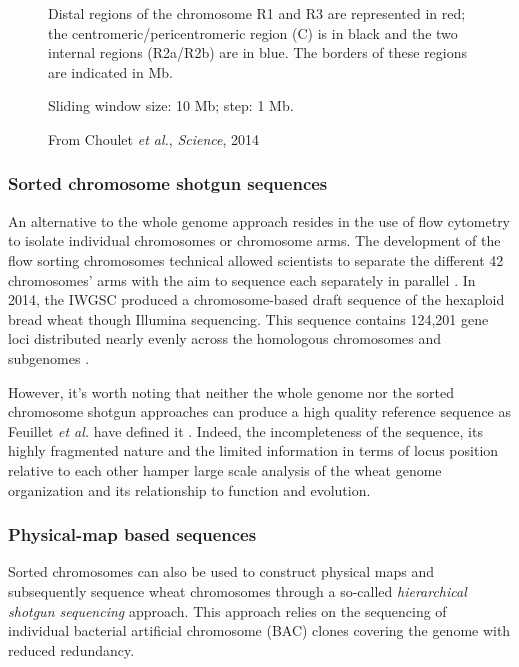 \documentclass[a4paper, 12pt]{article}
\begin{document}
\begin{onehalfspace}
\begin{figure}
{    Distal regions of the chromosome R1 and R3 are represented in red; the centromeric/pericentromeric region (C) is in black and the two internal regions (R2a/R2b) are in blue. The borders of these regions are indicated in Mb. 
    
    Sliding window size: 10 Mb; step: 1 Mb.
    
          \begin{flushright}
          From Choulet \textit{et al.}, \textit{Science}, 2014
          \end{flushright}}
    \end{figure}
\addtocounter{page}{-1}
\newpage
\clearpage %


            \subsubsection{Sorted chromosome shotgun sequences}

An alternative to the whole genome approach resides in the use of flow cytometry to isolate individual chromosomes or chromosome arms. The development of the flow sorting chromosomes technical allowed scientists to separate the different 42 chromosomes' arms with the aim to sequence each separately in parallel \citep{Dolezel2014}. In 2014, the IWGSC produced a chromosome-based draft sequence of the hexaploid bread wheat though Illumina sequencing. This sequence contains 124,201 gene loci distributed nearly evenly across the homologous chromosomes and subgenomes \citep{Mayer2014}.

However, it's worth noting that neither the whole genome nor the sorted chromosome shotgun approaches can produce a high quality reference sequence as Feuillet \textit{et al.} have defined it \citep{Feuillet2011}. Indeed, the incompleteness of the sequence, its highly fragmented nature and the limited information in terms of locus position relative to each other hamper large scale analysis of the wheat genome organization and its relationship to function and evolution.

            \subsubsection{Physical-map based sequences}

Sorted chromosomes can also be used to construct physical maps and subsequently sequence wheat chromosomes through a so-called \textit{hierarchical shotgun sequencing} approach. This approach relies on the sequencing of individual bacterial artificial chromosome (BAC) clones covering the genome with reduced redundancy.


\end{onehalfspace}
\end{document}
